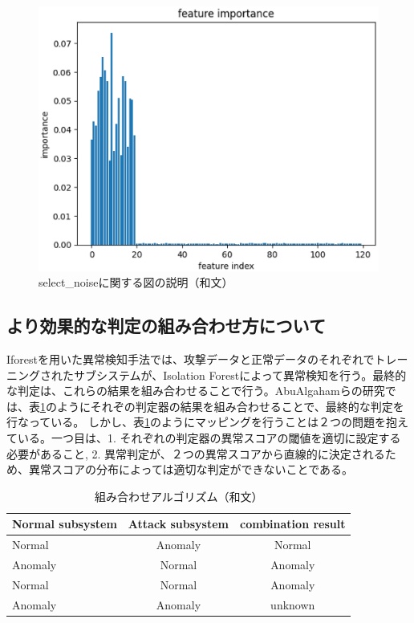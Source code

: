\documentclass{css}
\begin{document}
\begin{figure}[tb]
    \centering
    \includegraphics[width=\linewidth]{pictures/eps/select_noise.eps}
    \caption{select\_noiseに関する図の説明（和文）}
    \label{fig:select_noise}
\end{figure}

\subsection{より効果的な判定の組み合わせ方について}
Iforestを用いた異常検知手法では、攻撃データと正常データのそれぞれでトレーニングされたサブシステムが、Isolation Forestによって異常検知を行う。最終的な判定は、これらの結果を組み合わせることで行う。AbuAlgahamらの研究では、表\ref{tab:combination}のようにそれぞの判定器の結果を組み合わせることで、最終的な判定を行なっている。
しかし、表\ref{tab:combination}のようにマッピングを行うことは２つの問題を抱えている。一つ目は、1. それぞれの判定器の異常スコアの閾値を適切に設定する必要があること, 2. 異常判定が、２つの異常スコアから直線的に決定されるため、異常スコアの分布によっては適切な判定ができないことである。

\begin{table}[tb]
    \caption{組み合わせアルゴリズム（和文）}
    \centering
    \footnotesize
    \begin{tabular}{lcc}
        \hline
        Normal subsystem & Attack subsystem & combination result\\
        \hline
        Normal & Anomaly & Normal \\
        Anomaly & Normal & Anomaly \\
        Normal & Normal & Anomaly \\
        Anomaly & Anomaly & unknown \\
        \hline
    \end{tabular}
    \label{tab:combination}
\end{table}
\end{document}
